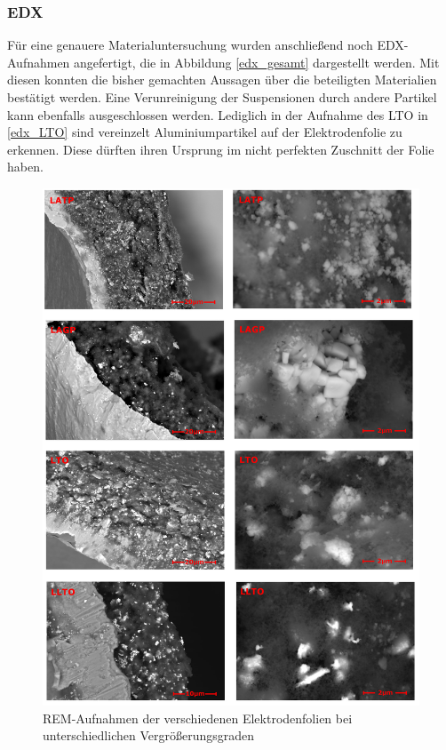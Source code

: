 \documentclass[a4paper, 11pt, headsepline,footsepline,twoside,abstract]{scrbook}
\begin{document}
\subsubsection{EDX}
Für eine genauere Materialuntersuchung wurden anschließend noch EDX-Aufnahmen angefertigt, die in Abbildung \ref{edx_gesamt} dargestellt werden. Mit diesen konnten die bisher gemachten Aussagen über die beteiligten Materialien bestätigt werden. Eine Verunreinigung der Suspensionen durch andere Partikel kann ebenfalls ausgeschlossen werden. Lediglich in der Aufnahme des LTO in \ref{edx_LTO} sind vereinzelt Aluminiumpartikel auf der Elektrodenfolie zu erkennen. Diese dürften ihren Ursprung im nicht perfekten Zuschnitt der Folie haben.
\begin{figure}
	\centering
	\includegraphics[width=1.0\columnwidth]{images/Uebersicht_REM.jpg}
	\caption{REM-Aufnahmen der verschiedenen Elektrodenfolien bei unterschiedlichen Vergrößerungsgraden}
	\label{uebersicht_rem}
\end{figure}
\end{document}
